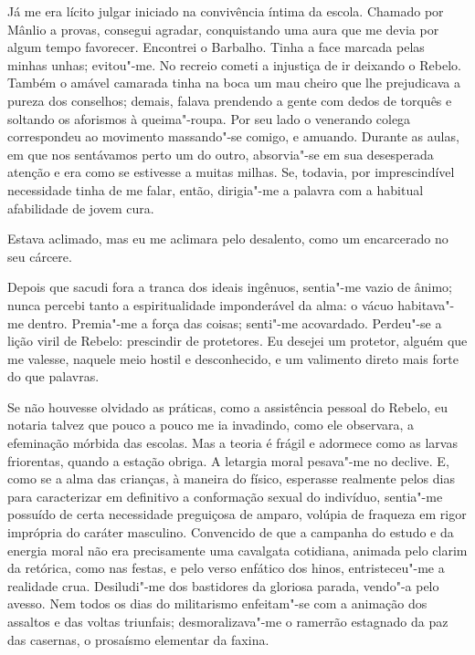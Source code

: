 Já me era lícito julgar iniciado na convivência íntima da
escola. Chamado por Mânlio a provas, consegui agradar, conquistando uma
aura que me devia por algum tempo favorecer. Encontrei o Barbalho.
Tinha a face marcada pelas minhas unhas; evitou"-me. No recreio cometi
a injustiça de ir deixando o Rebelo. Também o amável camarada tinha na
boca um mau cheiro que lhe prejudicava a pureza dos conselhos; demais,
falava prendendo a gente com dedos de torquês e soltando os aforismos à
queima"-roupa. Por seu lado o venerando colega correspondeu ao
movimento massando"-se comigo, e amuando. Durante as aulas, em que nos
sentávamos perto um do outro, absorvia"-se em sua desesperada atenção
e era como se estivesse a muitas milhas. Se, todavia, por
imprescindível necessidade tinha de me falar, então, dirigia"-me a
palavra com a habitual afabilidade de jovem cura. 

Estava aclimado, mas eu me aclimara pelo desalento, como um encarcerado 
no seu cárcere. 

Depois que sacudi fora a tranca dos ideais ingênuos, sentia"-me 
vazio de ânimo; nunca percebi tanto a espiritualidade imponderável da alma: o
vácuo habitava"-me dentro. Premia"-me a força das coisas; senti"-me
acovardado. Perdeu"-se a lição viril de Rebelo: prescindir de
protetores. Eu desejei um protetor, alguém que me valesse, naquele meio
hostil e desconhecido, e um valimento direto mais forte do que palavras. 

Se não houvesse olvidado as práticas, como a assistência
pessoal do Rebelo, eu notaria talvez que pouco a pouco me ia invadindo,
como ele observara, a efeminação mórbida das escolas. Mas a teoria é
frágil e adormece como as larvas friorentas, quando a estação obriga. A
letargia moral pesava"-me no declive. E, como se a alma das crianças,
à maneira do físico, esperasse realmente pelos dias para caracterizar em 
definitivo a conformação sexual do indivíduo,
sentia"-me possuído de certa necessidade preguiçosa de amparo, volúpia
de fraqueza em rigor imprópria do caráter masculino. Convencido de que
a campanha do estudo e da energia moral não era precisamente uma
cavalgata cotidiana, animada pelo clarim da retórica, como nas festas,
e pelo verso enfático dos hinos, entristeceu"-me a realidade crua.
Desiludi"-me dos bastidores da gloriosa parada, vendo"-a pelo avesso.
Nem todos os dias do militarismo enfeitam"-se com a animação dos
assaltos e das voltas triunfais; desmoralizava"-me o ramerrão
estagnado da paz das casernas, o prosaísmo elementar da faxina. 


